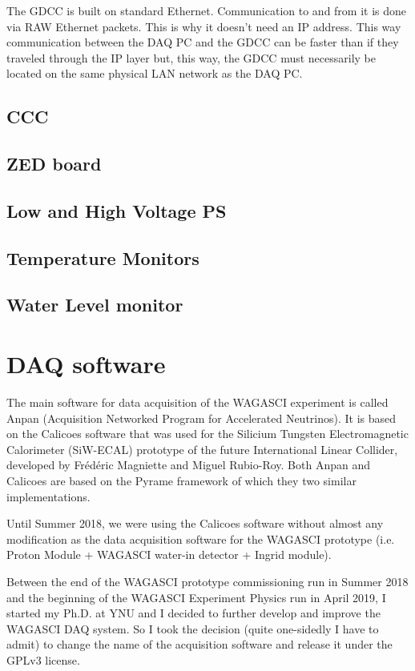 The GDCC is built on standard Ethernet. Communication to and from it
is done via RAW Ethernet packets. This is why it doesn't need an IP
address. This way communication between the DAQ PC and the GDCC can be
faster than if they traveled through the IP layer but, this way, the
GDCC must necessarily be located on the same physical LAN network as
the DAQ PC.

\section{CCC}
\section{ZED board}
\section{Low and High Voltage PS}
\section{Temperature Monitors}
\section{Water Level monitor}

\chapter{DAQ software}
The main software for data acquisition of the WAGASCI experiment is
called Anpan (Acquisition Networked Program for Accelerated
Neutrinos). It is based on the Calicoes software that was used for the
Silicium Tungsten Electromagnetic Calorimeter (SiW-ECAL) prototype of
the future International Linear Collider, developed by Frédéric
Magniette and Miguel Rubio-Roy. Both Anpan and Calicoes are based on
the Pyrame framework of which they two similar implementations.

Until Summer 2018, we were using the Calicoes software without almost
any modification as the data acquisition software for the WAGASCI
prototype (i.e. Proton Module + WAGASCI water-in detector + Ingrid
module).

Between the end of the WAGASCI prototype commissioning run in Summer
2018 and the beginning of the WAGASCI Experiment Physics run in April
2019, I started my Ph.D. at YNU and I decided to further develop and
improve the WAGASCI DAQ system. So I took the decision (quite
one-sidedly I have to admit) to change the name of the acquisition
software and release it under the GPLv3 license.

